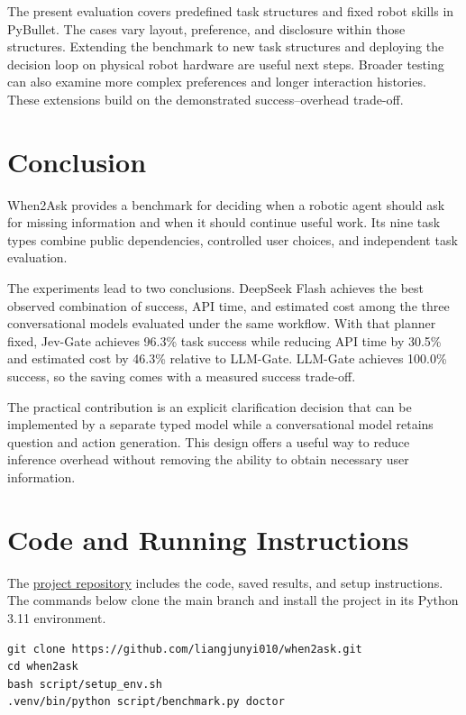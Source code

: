 \documentclass{article}
\begin{document}
The present evaluation covers predefined task structures and fixed robot
skills in PyBullet. The cases vary layout, preference, and disclosure within
those structures. Extending the benchmark to new task structures and deploying
the decision loop on physical robot hardware are useful next steps.
Broader testing can also examine more complex preferences and longer
interaction histories. These extensions build on the demonstrated
success--overhead trade-off.

\section{Conclusion}

When2Ask provides a benchmark for deciding when a robotic agent should ask for
missing information and when it should continue useful work. Its nine task
types combine public dependencies, controlled user choices, and independent
task evaluation.

The experiments lead to two conclusions. DeepSeek Flash achieves the best
observed combination of success, API time, and estimated cost among the three
conversational models evaluated under the same workflow. With that planner
fixed, Jev-Gate achieves 96.3\% task success while reducing API time by 30.5\%
and estimated cost by 46.3\% relative to LLM-Gate. LLM-Gate achieves 100.0\%
success, so the saving comes with a measured success trade-off.

The practical contribution is an explicit clarification decision that can be
implemented by a separate typed model while a conversational model retains
question and action generation. This design offers a useful way to reduce
inference overhead without removing the ability to obtain necessary user
information.

\clearpage



\clearpage
\appendix
\section{Code and Running Instructions}
\label{app:code}

The \href{https://github.com/liangjunyi010/when2ask}{project repository}
includes the code, saved results, and setup instructions. The commands below
clone the main branch and install the
project in its Python 3.11 environment.

\begin{verbatim}
git clone https://github.com/liangjunyi010/when2ask.git
cd when2ask
bash script/setup_env.sh
.venv/bin/python script/benchmark.py doctor
\end{verbatim}
\end{document}
